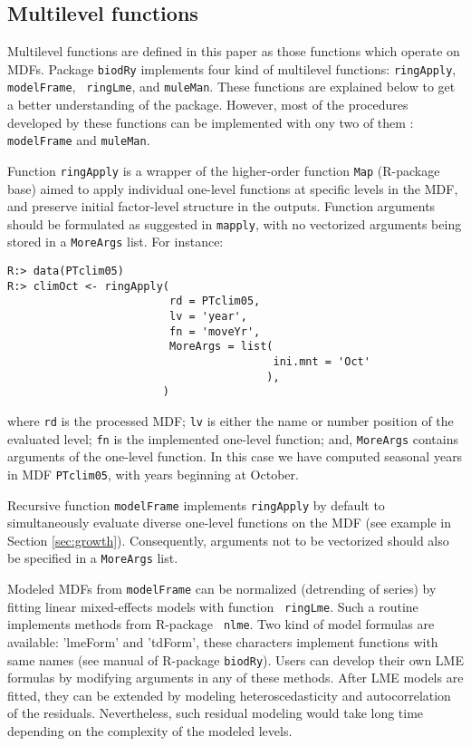 \documentclass[review,authoryear]{elsarticle}
\begin{document}
\subsection{Multilevel functions}\label{sec:mlev}

Multilevel functions are defined in this paper as those functions
which operate on MDFs.  Package {\tt biodRy} implements four kind of
multilevel functions: {\tt ringApply}, {\tt modelFrame}, {\tt
  ringLme}, and {\tt muleMan}. These functions are explained below to
get a better understanding of the package. However, most of the
procedures developed by these functions can be implemented with ony
two of them : {\tt modelFrame} and {\tt muleMan}.

Function {\tt ringApply} is a wrapper of the higher-order function
{\tt Map} (R-package base) aimed to apply individual one-level
functions at specific levels in the MDF, and preserve initial
factor-level structure in the outputs. Function arguments should be
formulated as suggested in {\tt mapply}, with no vectorized arguments
being stored in a {\tt MoreArgs} list. For instance:

\begin{verbatim}
R:> data(PTclim05)
R:> climOct <- ringApply(
                         rd = PTclim05,
                         lv = 'year',
                         fn = 'moveYr',
                         MoreArgs = list(
                                         ini.mnt = 'Oct'           
                                        ),
                        )
\end{verbatim}

where {\tt rd} is the processed MDF; {\tt lv} is either the name or
number position of the evaluated level; {\tt fn} is the implemented
one-level function; and, {\tt MoreArgs} contains arguments of the
one-level function. In this case we have computed seasonal years in
MDF {\tt PTclim05}, with years beginning at October.

Recursive function {\tt modelFrame} implements {\tt ringApply} by
default to simultaneously evaluate diverse one-level functions on the
MDF (see example in Section \ref{sec:growth}). Consequently, arguments
not to be vectorized should also be specified in a {\tt MoreArgs}
list.

Modeled MDFs from {\tt modelFrame} can be normalized (detrending of
series) by fitting linear mixed-effects models with function {\tt
  ringLme}. Such a routine implements methods from R-package {\tt
  nlme}. Two kind of model formulas are available: 'lmeForm' and
'tdForm', these characters implement functions with same names (see
manual of R-package {\tt biodRy}). Users can develop their own LME
formulas by modifying arguments in any of these methods. After LME
models are fitted, they can be extended by modeling heteroscedasticity
and autocorrelation of the residuals. Nevertheless, such residual
modeling would take long time depending on the complexity of the
modeled levels.
\end{document}
